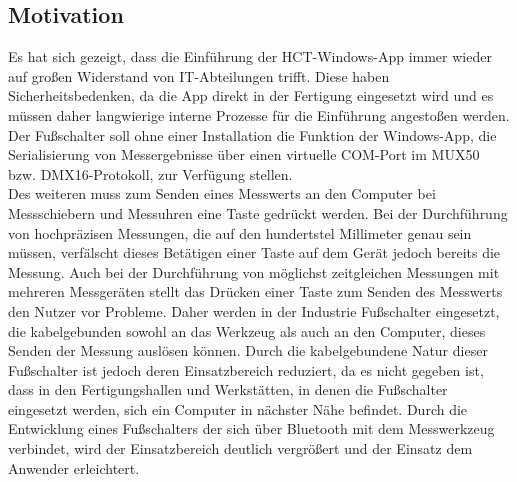 \subsection{Motivation}
Es hat sich gezeigt, dass die Einführung der HCT-Windows-App immer wieder auf großen Widerstand von IT-Abteilungen trifft. Diese haben Sicherheitsbedenken, da die App direkt in der Fertigung eingesetzt wird und es müssen daher langwierige interne Prozesse für die Einführung angestoßen werden. Der Fußschalter soll ohne einer Installation die Funktion der Windows-App, die Serialisierung von Messergebnisse über einen virtuelle COM-Port im MUX50 bzw. DMX16-Protokoll, zur Verfügung stellen. \\
Des weiteren muss zum Senden eines Messwerts an den Computer bei Messschiebern und Messuhren eine Taste gedrückt werden. Bei der Durchführung von hochpräzisen Messungen, die auf den hundertstel Millimeter genau sein müssen, verfälscht dieses Betätigen einer Taste auf dem Gerät jedoch bereits die Messung. Auch bei der Durchführung von möglichst zeitgleichen Messungen mit mehreren Messgeräten stellt das Drücken einer Taste zum Senden des Messwerts den Nutzer vor Probleme. Daher werden in der Industrie Fußschalter eingesetzt, die kabelgebunden sowohl an das Werkzeug als auch an den Computer, dieses Senden der Messung auslösen können. Durch die kabelgebundene Natur dieser Fußschalter ist jedoch deren Einsatzbereich reduziert, da es nicht gegeben ist, dass in den Fertigungshallen und Werkstätten, in denen die Fußschalter eingesetzt werden, sich ein Computer in nächster Nähe befindet. Durch die Entwicklung eines Fußschalters der sich über Bluetooth mit dem Messwerkzeug verbindet, wird der Einsatzbereich deutlich vergrößert und der Einsatz dem Anwender erleichtert.